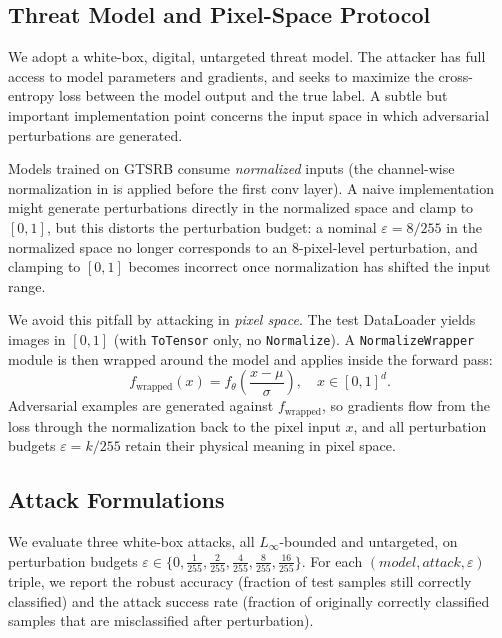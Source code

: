 \documentclass[11pt]{article}
\newcommand{\eps}{\varepsilon}
\begin{document}
\subsection{Threat Model and Pixel-Space Protocol}
\label{sec:method:threat}

We adopt a white-box, digital, untargeted threat model. The attacker has
full access to model parameters and gradients, and seeks to maximize the
cross-entropy loss between the model output and the true label. A subtle
but important implementation point concerns the input space in which
adversarial perturbations are generated.

Models trained on GTSRB consume \emph{normalized} inputs (the channel-wise
normalization in  is applied before the first conv layer).
A naive implementation might generate perturbations directly in the
normalized space and clamp to $[0, 1]$, but this distorts the perturbation
budget: a nominal $\eps = 8/255$ in the normalized space no longer
corresponds to an 8-pixel-level perturbation, and clamping to $[0, 1]$
becomes incorrect once normalization has shifted the input range.

We avoid this pitfall by attacking in \emph{pixel space}. The test
DataLoader yields images in $[0, 1]$ (with \texttt{ToTensor} only, no
\texttt{Normalize}). A \texttt{NormalizeWrapper} module is then wrapped
around the model and applies  inside the forward pass:
\begin{equation}
  f_{\text{wrapped}}(x) = f_{\theta}\!\left(\frac{x - \mu}{\sigma}\right),
  \quad x \in [0, 1]^d.
  \label{eq:normalize_wrapper}
\end{equation}
Adversarial examples are generated against $f_{\text{wrapped}}$, so
gradients flow from the loss through the normalization back to the pixel
input $x$, and all perturbation budgets $\eps = k/255$ retain their
physical meaning in pixel space.

\subsection{Attack Formulations}
\label{sec:method:attacks}

We evaluate three white-box attacks, all $L_\infty$-bounded and untargeted,
on perturbation budgets
$\eps \in \{0, \tfrac{1}{255}, \tfrac{2}{255}, \tfrac{4}{255}, \tfrac{8}{255}, \tfrac{16}{255}\}$.
For each $(model, attack, \eps)$ triple, we report the robust accuracy
(fraction of test samples still correctly classified) and the attack
success rate (fraction of originally correctly classified samples that
are misclassified after perturbation).
\end{document}
